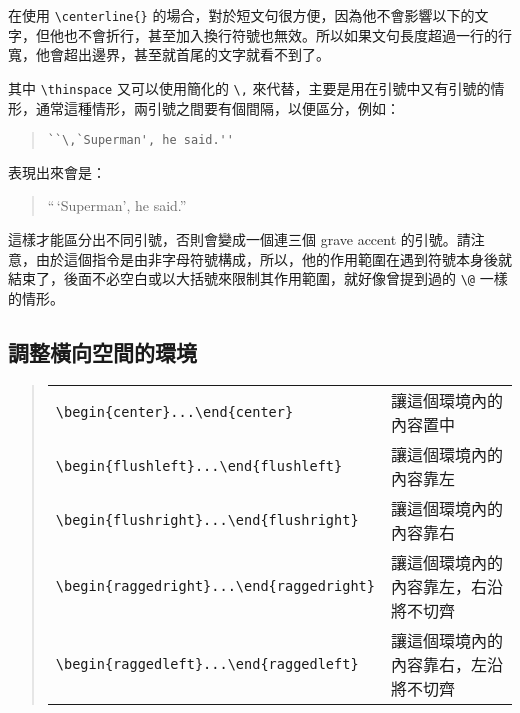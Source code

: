 在使用 \verb|\centerline{}| 的場合，對於短文句很方便，因為他不會影響以下的文字，但他也不會折行，甚至加入換行符號也無效。所以如果文句長度超過一行的行寬，他會超出邊界，甚至就首尾的文字就看不到了。

其中 \verb|\thinspace| 又可以使用簡化的 \verb|\,| 來代替，主要是用在引號中又有引號的情形，通常這種情形，兩引號之間要有個間隔，以便區分，例如：

\begin{quote}
   \begin{verbatim}
``\,`Superman', he said.''
\end{verbatim}
\end{quote}

表現出來會是：

\begin{quote}
   ``\,`Superman', he said.''
\end{quote}

這樣才能區分出不同引號，否則會變成一個連三個 grave accent 的引號。請注意，由於這個指令是由非字母符號構成，所以，他的作用範圍在遇到符號本身後就結束了，後面不必空白或以大括號來限制其作用範圍，就好像曾提到過的 \verb|\@| 一樣的情形。

\subsection{調整橫向空間的環境}

\begin{quote}
   \begin{tabular}{ll}
      \verb|\begin{center}...\end{center}| & 讓這個環境內的內容置中               \\
      \verb|\begin{flushleft}...\end{flushleft}| & 讓這個環境內的內容靠左               \\
      \verb|\begin{flushright}...\end{flushright}| & 讓這個環境內的內容靠右               \\
      \verb|\begin{raggedright}...\end{raggedright}| & 讓這個環境內的內容靠左，右沿將不切齊 \\
      \verb|\begin{raggedleft}...\end{raggedleft}| & 讓這個環境內的內容靠右，左沿將不切齊 \\
   \end{tabular}
\end{quote}
%
%


